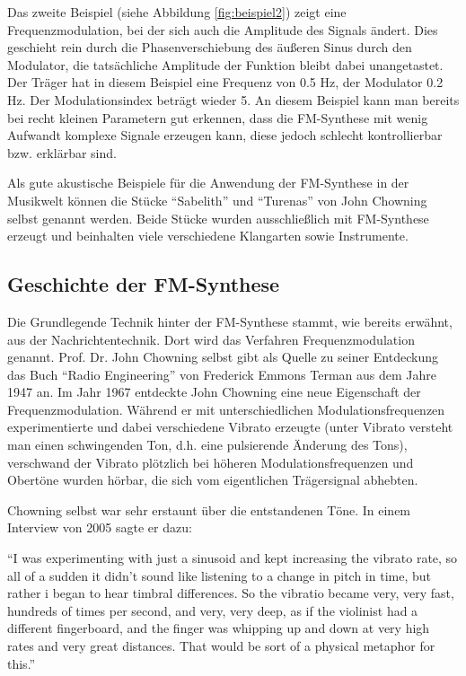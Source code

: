 Das zweite Beispiel (siehe Abbildung \ref{fig:beispiel2}) zeigt eine Frequenzmodulation, bei der sich auch die Amplitude des Signals ändert. Dies geschieht rein durch die Phasenverschiebung des äußeren Sinus durch den Modulator, die tatsächliche Amplitude der Funktion bleibt dabei unangetastet. Der Träger hat in diesem Beispiel eine Frequenz von 0.5 Hz, der Modulator 0.2 Hz. Der Modulationsindex beträgt wieder 5. An diesem Beispiel kann man bereits bei recht kleinen Parametern gut erkennen, dass die FM-Synthese mit wenig Aufwandt komplexe Signale erzeugen kann, diese jedoch schlecht kontrollierbar bzw. erklärbar sind.

Als gute akustische Beispiele für die Anwendung der FM-Synthese in der Musikwelt können die Stücke ``Sabelith'' und ``Turenas'' von John Chowning selbst genannt werden. Beide Stücke wurden ausschließlich mit FM-Synthese erzeugt und beinhalten viele verschiedene Klangarten sowie Instrumente.

\subsection{Geschichte der FM-Synthese}
Die Grundlegende Technik hinter der FM-Synthese stammt, wie bereits erwähnt, aus der Nachrichtentechnik. Dort wird das Verfahren Frequenzmodulation genannt. Prof. Dr. John Chowning selbst gibt als Quelle zu seiner Entdeckung das Buch ``Radio Engineering'' von Frederick Emmons Terman aus dem Jahre 1947 an. Im Jahr 1967 entdeckte John Chowning eine neue Eigenschaft der Frequenzmodulation. Während er mit unterschiedlichen Modulationsfrequenzen experimentierte und dabei verschiedene Vibrato erzeugte (unter Vibrato versteht man einen schwingenden Ton, d.h. eine pulsierende Änderung des Tons), verschwand der Vibrato plötzlich bei höheren Modulationsfrequenzen und Obertöne wurden hörbar, die sich vom eigentlichen Trägersignal abhebten.

Chowning selbst war sehr erstaunt über die entstandenen Töne. In einem Interview von 2005 sagte er dazu: 

``I was experimenting with just a sinusoid and kept increasing the vibrato rate, so all of a sudden it didn't sound like listening to a change in pitch in time, but rather i began to hear timbral differences. So the vibratio became very, very fast, hundreds of times per second, and very, very deep, as if the violinist had a different fingerboard, and the finger was whipping up and down at very high rates and very great distances. That would be sort of a physical metaphor for this.''

